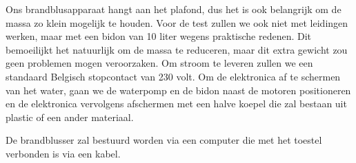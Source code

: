 \documentclass{kulakarticle}
\begin{document}
Ons brandblusapparaat hangt aan het plafond, dus het is ook belangrijk om de massa zo klein mogelijk te houden. Voor de test zullen we ook niet met leidingen werken, maar met een bidon van 10 liter wegens praktische redenen. Dit bemoeilijkt het natuurlijk om de massa te reduceren, maar dit extra gewicht zou geen problemen mogen veroorzaken. 
Om stroom te leveren zullen we een standaard Belgisch stopcontact van 230 volt.
Om de elektronica af te schermen van het water, gaan we de waterpomp en de bidon naast de motoren positioneren en de elektronica vervolgens afschermen met een halve koepel die zal bestaan uit plastic of een ander materiaal. 

De brandblusser zal bestuurd worden via een computer die met het toestel verbonden is via een kabel.
\end{document}
